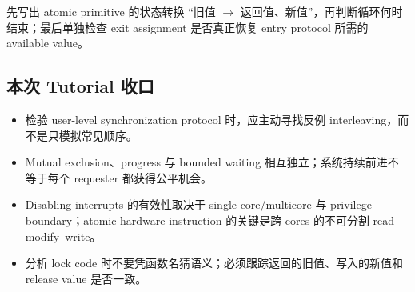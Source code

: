先写出 atomic primitive 的状态转换 ``旧值 $\to$ 返回值、新值''，再判断循环何时结束；最后单独检查 exit assignment 是否真正恢复 entry protocol 所需的 available value。

\subsection*{本次 Tutorial 收口}

\begin{itemize}[leftmargin=2em]
  \item 检验 user-level synchronization protocol 时，应主动寻找反例 interleaving，而不是只模拟常见顺序。
  \item Mutual exclusion、progress 与 bounded waiting 相互独立；系统持续前进不等于每个 requester 都获得公平机会。
  \item Disabling interrupts 的有效性取决于 single-core/multicore 与 privilege boundary；atomic hardware instruction 的关键是跨 cores 的不可分割 read--modify--write。
  \item 分析 lock code 时不要凭函数名猜语义；必须跟踪返回的旧值、写入的新值和 release value 是否一致。
\end{itemize}
